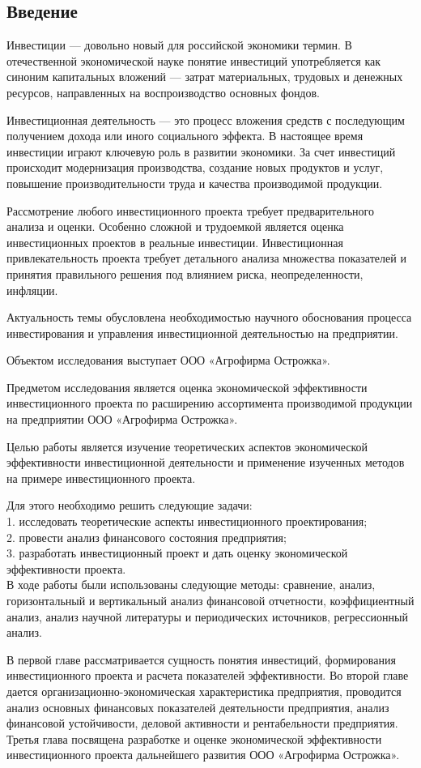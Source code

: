 \subsection*{Введение}
Инвестиции --- довольно новый для российской экономики термин. В отечественной экономической науке понятие инвестиций употребляется как синоним капитальных вложений --- затрат материальных, трудовых и денежных ресурсов, направленных на воспроизводство основных фондов.

Инвестиционная деятельность --- это процесс вложения средств с последующим получением дохода или иного социального эффекта. В настоящее время инвестиции играют ключевую роль в развитии экономики. За счет инвестиций происходит модернизация производства, создание новых продуктов и услуг, повышение производительности труда и качества производимой продукции.

Рассмотрение любого инвестиционного проекта требует предварительного анализа и оценки. Особенно сложной и трудоемкой является оценка инвестиционных проектов в реальные инвестиции. Инвестиционная привлекательность проекта требует детального анализа множества показателей и принятия правильного решения под влиянием риска, неопределенности, инфляции.

Актуальность темы обусловлена необходимостью научного обоснования процесса инвестирования и управления инвестиционной деятельностью на предприятии.

Объектом исследования выступает ООО «Агрофирма Острожка».

Предметом исследования является оценка экономической эффективности инвестиционного проекта по расширению ассортимента производимой продукции на предприятии ООО «Агрофирма Острожка».

Целью работы является изучение теоретических аспектов экономической эффективности инвестиционной деятельности и применение изученных методов на примере инвестиционного проекта.

Для этого необходимо решить следующие задачи:\\
1. исследовать теоретические аспекты инвестиционного проектирования;\\
2. провести анализ финансового состояния предприятия;\\
3. разработать инвестиционный проект и дать оценку экономической эффективности проекта.\\

В ходе работы были использованы следующие методы: сравнение, анализ, горизонтальный и вертикальный анализ финансовой отчетности, коэффициентный анализ, анализ научной литературы и периодических источников, регрессионный анализ.

В первой главе рассматривается сущность понятия инвестиций, формирования инвестиционного проекта и расчета показателей эффективности. Во второй главе дается организационно-экономическая характеристика предприятия, проводится анализ основных финансовых показателей деятельности предприятия, анализ финансовой устойчивости, деловой активности и рентабельности предприятия. Третья глава посвящена разработке и оценке экономической эффективности инвестиционного проекта дальнейшего развития ООО «Агрофирма Острожка».
